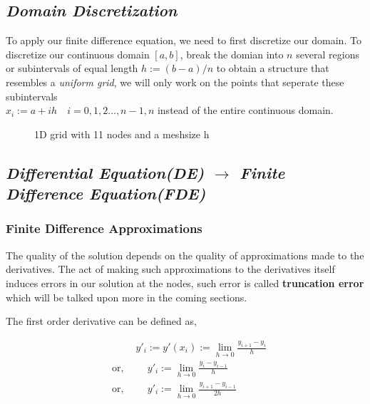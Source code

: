 \documentclass[12pt]{article}
\begin{document}
 	\subsection[Discretization]{\textit{Domain Discretization}}
 	To apply our finite difference equation, we need to first discretize our domain.
 	To discretize our continuous domain $ [a,b] $, break the domian into $ n $ several regions or subintervals of equal length $ h := (b-a)/n $ to obtain a structure that resembles a \textit{uniform grid}, we will only work on the points that seperate these subintervals\\ $ x_i := a + ih \quad i=0,1,2\dots,n-1,n $ instead of the entire continuous domain.
 	\begin{figure}[h]
 		\centering
 		
 		\caption{\small 1D grid with 11 nodes and a meshsize h}
 	\end{figure}
 
 	\subsection{\textit{Differential Equation(DE) $ \rightarrow $ Finite Difference Equation(FDE)}}
 	\subsubsection{Finite Difference Approximations}
 	The quality of the solution depends on the quality of approximations made to the derivatives. The act of making such approximations to the derivatives itself induces errors in our solution at the nodes, such error is called \textbf{truncation error} which will be talked upon more in the coming sections.
 	
 	
 	The first order derivative can be defined as,
 	{\raggedright 
 		\begin{align*}
 			&\text{} \hspace{1cm} y'_i := y'(x_i) := \lim_{h \to 0} \frac{y_{i+1} - y_i}{h}  \\
 			&\text{or,} \hspace{1cm} y'_i := \lim_{h \to 0} \frac{y_{i} - y_{i-1}}{h}  \\
 			&\text{or,} \hspace{1cm} y'_i := \lim_{h \to 0} \frac{y_{i+1} - y_{i-1}}{2h}  
 		\end{align*}
 	}
 	
\end{document}
